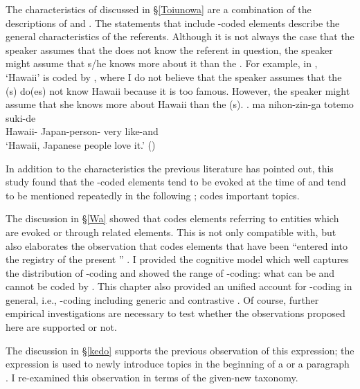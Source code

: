 The characteristics of 
discussed in \S \ref{Toiunowa}
are a combination of
the descriptions of  and .
The statements that include -coded elements describe the general characteristics of the referents.
Although it is not always the case that the speaker assumes that the  does not know the referent in question,
the speaker might assume that s/he knows more about it than the .
For example, in \Next,
 `Hawaii' is coded by ,
where I do not believe that
the speaker assumes that the (s) do(es) not know Hawaii
because it is too famous.
However, the speaker might assume that she knows more about Hawaii than the (s).
%
\exg.  ma nihon-zin-ga totemo suki-de \\
	Hawaii-  Japan-person- very like-and \\
	`Hawaii, Japanese people love it.'
	\hfill{()}

In addition to the characteristics the previous literature has pointed out,
this study found that
the -coded elements tend to be evoked at the time of 
and tend to be mentioned repeatedly in the following ;
 codes important topics.

The discussion in \S \ref{Wa} showed that
 codes elements referring to entities which are
evoked or  through related elements.
This is not only compatible with, but also elaborates the observation that
 codes elements that have been ``entered into the registry of the present '' \cite[45]{kuno73}.
I provided the cognitive model which well captures the distribution of -coding and showed the range of -coding:
what can be and cannot be coded by .
This chapter also provided an unified account for -coding in general,
i.e., -coding including generic and contrastive .
Of course, further empirical investigations are necessary to test whether the observations proposed here are supported or not.

The discussion in \S \ref{kedo} supports the previous observation of this  expression;
the expression is used to newly introduce topics in the beginning of a  or a paragraph \cite{koide84,takahashi99}.
I re-examined this observation in terms of the given-new taxonomy.

